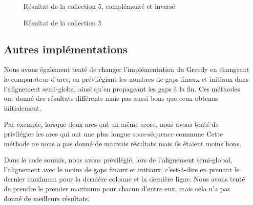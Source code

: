 \begin{figure}[!ht]
\begin{minipage}[c]{.46 \linewidth}
\begin{center}
			Résultat de la collection 5, complémenté et inversé
		\end{center}
	\end{minipage}
	\caption{Résultat de la collection 5}
\end{figure}

\FloatBarrier

\subsection{Autres implémentations}

Nous avons également tenté de changer l'implémentation du Greedy en changeant
le comparateur d'arcs, en prévilégiant les nombres de gaps finaux et initiaux
dans l'alignement semi-global ainsi qu'en propageant les gaps à la fin. Ces
méthodes ont donné des résultats différents mais pas aussi bons que ceux obtenus
initialement.

Par exemple, lorsque deux arcs ont un même score, nous avons tenté de
privilégier les arcs qui ont une plus longue sous-séquence commune Cette méthode
ne nous a pas donné de mauvais résultats mais ils étaient moins bons.

Dans le code soumis, nous avons prévilégié, lors de l'alignement semi-global,
l'alignement avec le moins de gaps finaux et initiaux, c'est-à-dire en
prenant le dernier maximum pour la dernière colonne et la dernière ligne. Nous
avons tenté de prendre le premier maximum pour chacun d'entre eux, mais cela n'a
pas donné de meilleurs résultats.

